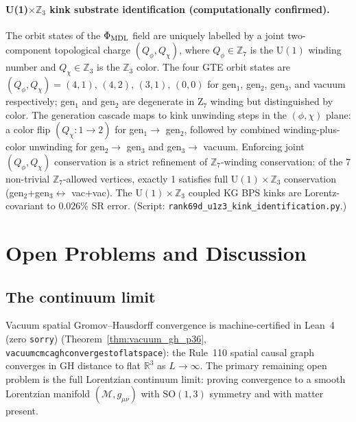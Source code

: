 \documentclass[11pt]{article}
\theoremstyle{remark}
\newcommand{\lean}[1]{%
  \penalty-100
  \begingroup\def\_{\textunderscore\allowbreak}\texttt{#1}\endgroup}
\newcommand{\CatA}{computationally confirmed}
\newcommand{\CatAL}{machine-certified in Lean~4 (zero \texttt{sorry})}
\begin{document}
\paragraph{U(1)$\times\mathbb{Z}_3$ kink substrate identification (\CatA).}
The orbit states of the $\Phi_{\rm MDL}$ field are uniquely labelled by a
joint two-component topological charge $(Q_\phi, Q_\chi)$, where
$Q_\phi \in \mathbb{Z}_7$ is the $\mathrm{U}(1)$ winding number and
$Q_\chi \in \mathbb{Z}_3$ is the $\mathbb{Z}_3$ color.
The four GTE orbit states are $(Q_\phi, Q_\chi) = (4,1),\,(4,2),\,(3,1),\,(0,0)$
for gen$_1$, gen$_2$, gen$_3$, and vacuum respectively; gen$_1$ and gen$_2$
are degenerate in Z$_7$ winding but distinguished by color.
The generation cascade maps to kink unwinding steps in the $(\phi,\chi)$ plane:
a color flip $(Q_\chi: 1 \to 2)$ for gen$_1 \to$ gen$_2$, followed by combined
winding-plus-color unwinding for gen$_2 \to$ gen$_3$ and gen$_3 \to$ vacuum.
Enforcing joint $(Q_\phi, Q_\chi)$ conservation is a strict refinement of
$\mathbb{Z}_7$-winding conservation: of the 7 non-trivial $\mathbb{Z}_7$-allowed vertices,
exactly 1 satisfies full $\mathrm{U}(1)\times\mathbb{Z}_3$ conservation
(gen$_2$+gen$_3 \leftrightarrow$ vac+vac).
The $\mathrm{U}(1)\times\mathbb{Z}_3$ coupled KG BPS kinks are Lorentz-covariant
to $0.026\%$ SR error.
(Script: \texttt{rank69d\_u1z3\_kink\_identification.py}.)

\section{Open Problems and Discussion}
\label{sec:discussion}

\subsection{The continuum limit}
\label{ssec:continuum_gap}

Vacuum spatial Gromov--Hausdorff convergence is \CatAL{} (Theorem~\ref{thm:vacuum_gh_p36},
\lean{vacuum\_cmca\_gh\_converges\_to\_flat\_space}): the Rule~110 spatial causal graph
converges in GH distance to flat $\mathbb{R}^3$ as $L\to\infty$. The primary remaining
open problem is the full Lorentzian continuum limit: proving convergence to a smooth
Lorentzian manifold $(\mathcal{M}, g_{\mu\nu})$ with $\mathrm{SO}(1,3)$ symmetry and
with matter present.
\end{document}
